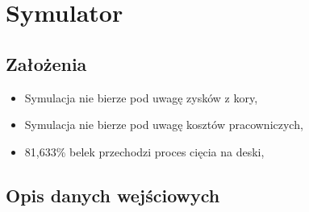 \documentclass[a4paper]{article}
\begin{document}
\section{Symulator}
\subsection{Założenia}
\begin{itemize}
\item Symulacja nie bierze pod uwagę zysków z kory,
\item Symulacja nie bierze pod uwagę kosztów pracowniczych,
\item 81,633\% belek przechodzi proces cięcia na deski,
\end{itemize}
\subsection{Opis danych wejściowych}
\end{document}
